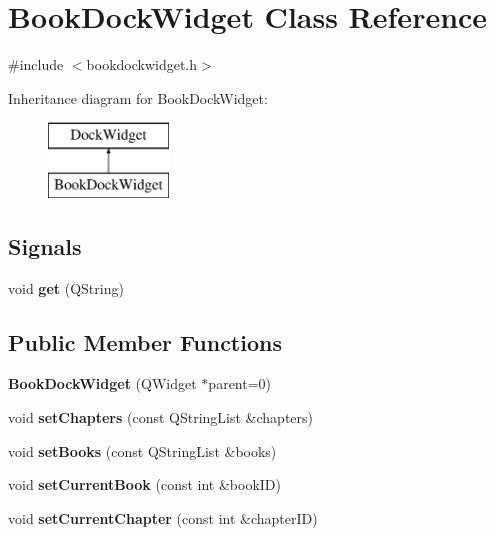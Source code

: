 \hypertarget{classBookDockWidget}{
\section{BookDockWidget Class Reference}
\label{classBookDockWidget}
}


{\ttfamily \#include $<$bookdockwidget.h$>$}

Inheritance diagram for BookDockWidget:\begin{figure}[H]
\begin{center}
\leavevmode
\includegraphics[height=2cm]{classBookDockWidget}
\end{center}
\end{figure}
\subsection*{Signals}
\begin{DoxyCompactItemize}
\item 
\hypertarget{classBookDockWidget_a1c706baddb8a67185b4fd62af5e8b1a8}{
void {\bfseries get} (QString)}
\label{classBookDockWidget_a1c706baddb8a67185b4fd62af5e8b1a8}

\end{DoxyCompactItemize}
\subsection*{Public Member Functions}
\begin{DoxyCompactItemize}
\item 
\hypertarget{classBookDockWidget_af5c76e68675b6b8537339a04087225df}{
{\bfseries BookDockWidget} (QWidget $\ast$parent=0)}
\label{classBookDockWidget_af5c76e68675b6b8537339a04087225df}

\item 
\hypertarget{classBookDockWidget_a3e3072148739620a1a062271f41a082b}{
void {\bfseries setChapters} (const QStringList \&chapters)}
\label{classBookDockWidget_a3e3072148739620a1a062271f41a082b}

\item 
\hypertarget{classBookDockWidget_a0a52db7a837f9919f4efbf67d6aa63e6}{
void {\bfseries setBooks} (const QStringList \&books)}
\label{classBookDockWidget_a0a52db7a837f9919f4efbf67d6aa63e6}

\item 
\hypertarget{classBookDockWidget_a576c69237313077d9a6fe0a108ba0d26}{
void {\bfseries setCurrentBook} (const int \&bookID)}
\label{classBookDockWidget_a576c69237313077d9a6fe0a108ba0d26}

\item 
\hypertarget{classBookDockWidget_a2c9972f1387ab48168c6ac6d2a1e15b7}{
void {\bfseries setCurrentChapter} (const int \&chapterID)}
\label{classBookDockWidget_a2c9972f1387ab48168c6ac6d2a1e15b7}

\end{DoxyCompactItemize}
